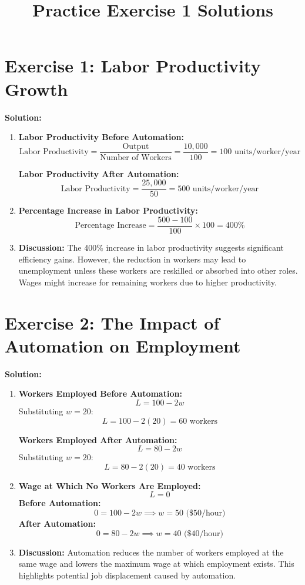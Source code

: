 \documentclass[12pt]{article}
\title{Practice Exercise 1 Solutions}
\author{}
\date{}
\begin{document}
\maketitle

\section*{Exercise 1: Labor Productivity Growth}
\textbf{Solution:}
\begin{enumerate}
    \item \textbf{Labor Productivity Before Automation:}
    \[ \text{Labor Productivity} = \frac{\text{Output}}{\text{Number of Workers}} = \frac{10,000}{100} = 100 \text{ units/worker/year} \]
    
    \textbf{Labor Productivity After Automation:}
    \[ \text{Labor Productivity} = \frac{25,000}{50} = 500 \text{ units/worker/year} \]
    
    \item \textbf{Percentage Increase in Labor Productivity:}
    \[ \text{Percentage Increase} = \frac{500 - 100}{100} \times 100 = 400\% \]
    
    \item \textbf{Discussion:}
    The 400\% increase in labor productivity suggests significant efficiency gains. However, the reduction in workers may lead to unemployment unless these workers are reskilled or absorbed into other roles. Wages might increase for remaining workers due to higher productivity.
\end{enumerate}

\section*{Exercise 2: The Impact of Automation on Employment}
\textbf{Solution:}
\begin{enumerate}
    \item \textbf{Workers Employed Before Automation:}
    \[ L = 100 - 2w \]
    Substituting $w = 20$:
    \[ L = 100 - 2(20) = 60 \text{ workers} \]
    
    \textbf{Workers Employed After Automation:}
    \[ L = 80 - 2w \]
    Substituting $w = 20$:
    \[ L = 80 - 2(20) = 40 \text{ workers} \]
    
    \item \textbf{Wage at Which No Workers Are Employed:}
    \[ L = 0 \]
    \textbf{Before Automation:}
    \[ 0 = 100 - 2w \implies w = 50 \text{ (\$50/hour)} \]
    \textbf{After Automation:}
    \[ 0 = 80 - 2w \implies w = 40 \text{ (\$40/hour)} \]
    
    \item \textbf{Discussion:}
    Automation reduces the number of workers employed at the same wage and lowers the maximum wage at which employment exists. This highlights potential job displacement caused by automation.
\end{enumerate}
\end{document}
